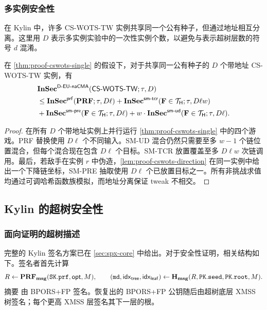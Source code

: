 \subsubsection{多实例安全性}
\label{sec:proof-cswots-multi}

在 Kylin 中，许多 CS-WOTS-TW 实例共享同一个公有种子，但通过地址相互分离。这里用 $D$ 表示多实例实验中的一次性实例个数，以避免与表示超树层数的符号 $d$ 混淆。

\begin{theorem}
\label{thm:proof-cswots-multi}
在 \cref{thm:proof-cswots-single} 的假设下，对于共享同一公有种子的 $D$ 个带地址 CS-WOTS-TW 实例，有
\begin{align}
&\mathbf{InSec}^{\mathsf{D\text{-}EU\text{-}naCMA}}
    (\mathsf{CS\text{-}WOTS\text{-}TW};\tau,D) \notag\\
&\le{}
    \mathbf{InSec}^{\mathsf{prf}}(\mathbf{PRF};\tau,D\ell)
    +\mathbf{InSec}^{\mathsf{sm\text{-}tcr}}(\mathbf{F}\in\mathcal{T}_{\mathsf{H}};\tau,D\ell w) \notag\\
&   +\mathbf{InSec}^{\mathsf{sm\text{-}pre}}(\mathbf{F}\in\mathcal{T}_{\mathsf{H}};\tau,D\ell)
    +w\cdot\mathbf{InSec}^{\mathsf{sm\text{-}ud}}(\mathbf{F}\in\mathcal{T}_{\mathsf{H}};\tau,D\ell).
\label{eq:proof-cswots-multi}
\end{align}
\end{theorem}

\begin{proof}
在所有 $D$ 个带地址实例上并行运行 \cref{thm:proof-cswots-single} 中的四个游戏。PRF 替换使用 $D\ell$ 个不同输入。SM-UD 混合仍然只需要至多 $w-1$ 个链位置混合，但每个混合现在包含 $D\ell$ 个目标。SM-TCR 放置覆盖至多 $D\ell w$ 次链调用。最后，若敌手在实例 $r$ 中伪造，\cref{lem:proof-cswots-direction} 在同一实例中给出一个下降链坐标，SM-PRE 抽取使用 $D\ell$ 个已放置目标之一。所有非挑战求值均通过可调哈希函数族模拟，而地址分离保证 tweak 不相交。
\end{proof}

\subsection{Kylin 的超树安全性}
\label{sec:proof-kylin-ht}

\subsubsection{面向证明的超树描述}
\label{sec:proof-ht-description}

完整的 Kylin 签名方案已在 \cref{sec:spx-core} 中给出。对于安全性证明，相关结构如下。签名者首先计算
\[
    R\gets\PRFmsg(\sk.\prf,\mathsf{opt},M),
    \qquad
    (\md,\mathsf{idx}_{\mathsf{tree}},\mathsf{idx}_{\mathsf{leaf}})
    \gets\hashmsg(R,\pk.\seed,\pk.\root,M).
\]
摘要 \md 由 BPORS+FP 签名。恢复出的 BPORS+FP 公钥随后由超树底层 XMSS 树签名；每个更高 XMSS 层签名其下一层的根。

